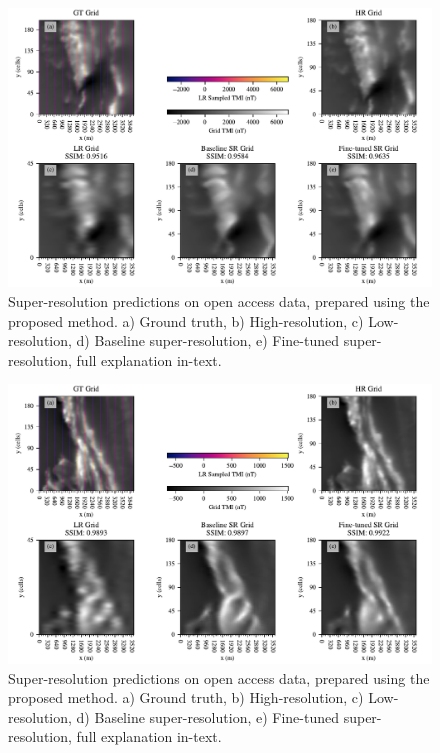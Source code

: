 \begin{landscape}
    \begin{figure}[hbtp]
        \centering
        \includegraphics[width=1\linewidth]{fig/p2/srcomp_14.pdf}
        \caption[Super-resolution geophysics grid results II]{Super-resolution predictions on open access data, prepared using the proposed method.
            a) Ground truth, b) High-resolution, c) Low-resolution, d) Baseline super-resolution, e) Fine-tuned super-resolution, full explanation in-text.
        }  
        \label{fig:srdata14}
    \end{figure}
\end{landscape}

\begin{landscape}
    \begin{figure}[hbtp]
        \centering
        \includegraphics[width=1\linewidth]{fig/p2/srcomp_17.pdf}
        \caption[Super-resolution geophysics grid results III]{Super-resolution predictions on open access data, prepared using the proposed method.
            a) Ground truth, b) High-resolution, c) Low-resolution, d) Baseline super-resolution, e) Fine-tuned super-resolution, full explanation in-text.
        }  
        \label{fig:srdata17}
    \end{figure}
\end{landscape}

